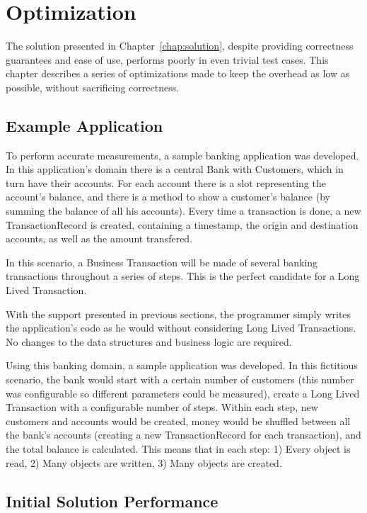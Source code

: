 \chapter{Optimization}

The solution presented in Chapter~\ref{chap:solution}, despite
providing correctness guarantees and ease of use, performs poorly in
even trivial test cases. This chapter describes a series of
optimizations made to keep the overhead as low as possible, without
sacrificing correctness.

\section{Example Application}

To perform accurate measurements, a sample banking application was
developed. In this application's domain there is a central Bank with
Customers, which in turn have their accounts. For each account there
is a slot representing the account's balance, and there is a method to
show a customer's balance (by summing the balance of all his
accounts). Every time a transaction is done, a new TransactionRecord
is created, containing a timestamp, the origin and destination
accounts, as well as the amount transfered.

In this scenario, a Business Transaction will be made of several
banking transactions throughout a series of steps. This is the perfect
candidate for a Long Lived Transaction.

With the support presented in previous sections, the programmer simply
writes the application's code as he would without considering Long
Lived Transactions. No changes to the data structures and business
logic are required.

Using this banking domain, a sample application was developed. In this
fictitious scenario, the bank would start with a certain number of
customers (this number was configurable so different parameters could
be measured), create a Long Lived Transaction with a configurable
number of steps. Within each step, new customers and accounts would be
created, money would be shuffled between all the bank's accounts
(creating a new TransactionRecord for each transaction), and the total
balance is calculated. This means that in each step: 1) Every object
is read, 2) Many objects are written, 3) Many objects are created.

\section{Initial Solution Performance}

